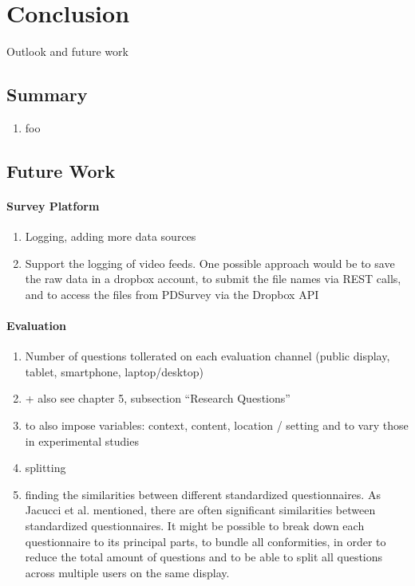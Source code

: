 \section{Conclusion}
\label{sec:conclusion}

Outlook and future work



\subsection{Summary}

\begin{enumerate}
\item foo
\end{enumerate}


\subsection{Future Work}


\paragraph{Survey Platform}

	\begin{enumerate}
	\item Logging, adding more data sources
	\item Support the logging of video feeds. One possible approach would be to save the raw data in a dropbox account, to submit the file names via REST calls, and to access the files from PDSurvey via the Dropbox API
	\end{enumerate}


\paragraph{Evaluation}

	\begin{enumerate}
	\item Number of questions tollerated on each evaluation channel (public display, tablet, smartphone, laptop/desktop)
	\item + also see chapter 5, subsection ``Research Questions'' 
	\item to also impose variables: context, content, location / setting and to vary those in experimental studies
	\item splitting 
	\item finding the similarities between different standardized questionnaires. As Jacucci et al. \cite{jacucci2010worldsofinformation} mentioned, there are often significant similarities between standardized questionnaires. It might be possible to break down each questionnaire to its principal parts, to bundle all conformities, in order to reduce the total amount of questions and to be able to split all questions across multiple users on the same display.
	\end{enumerate}

